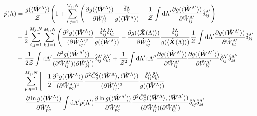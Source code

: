 \documentclass[%
 reprint,
 amsmath,amssymb,
 aps,nofootinbib,nobibnotes,onecolumn,prd
]{revtex4-2}
\begin{document}
\begin{align}
\hat{p}(\Lambda) &= \frac{
g(\expect{\hat{\bm W}^\Lambda})
}{
\mathcal{Z}
}
\Bigg(
1 
+ 
\sum_{i,j=1}^{M_j,N}\left(\frac{\partial g(\expect{\hat{\bm W}^\Lambda})}{\partial \hat{W}_{ij}^\Lambda}\frac{\hat{\delta}_{ij}^\Lambda}{g(\expect{\hat{\bm W}^\Lambda})}
-
\frac{1}{\mathcal{Z}}\int {\rm d}\Lambda'\frac{\partial g(\expect{\hat{\bm W}^{\Lambda'}})}{\partial \hat{W}_{ij}^{\Lambda'}}\hat{\delta}_{ij}^{\Lambda'}\right) \nonumber \\
&+ 
\frac{1}{2}\sum_{i,j=1}^{M_j,N}\sum_{k,l=1}^{M_l,N}
\left(\frac{\partial^2 g(\expect{\hat{\bm W}^\Lambda})}{(\partial \hat{W}_{ij}^\Lambda)^2}\frac{\hat{\delta}_{ij}^\Lambda\hat{\delta}_{kl}^\Lambda}{g(\expect{\hat{\bm W}^\Lambda})} -
\frac{\partial g(\expect{\hat{\bm X}(\Lambda)})}{\partial \hat{W}_{ij}^\Lambda}\frac{\hat{\delta}_{ij}^\Lambda}{g(\expect{\hat{\bm X}(\Lambda)})} \frac{1}{\mathcal{Z}}\int {\rm d}\Lambda'\frac{\partial g(\expect{\hat{\bm W}^{\Lambda'}})}{\partial \hat{W}_{kl}^{\Lambda'}}\hat{\delta}_{kl}^{\Lambda'} \right.
\nonumber \\ 
&- \left. \frac{1}{2\mathcal{Z}}\int {\rm d}\Lambda' \frac{\partial^2 g(\expect{\hat{\bm W}^{\Lambda'}})}{(\partial \hat{W}_{ij}^{\Lambda'})(\partial \hat{W}_{kl}^{\Lambda'})}\hat{\delta}_{ij}^{\Lambda'}\hat{\delta}_{kl}^{\Lambda'}
+
\frac{1}{\mathcal{Z}^2}\int {\rm d}\Lambda' {\rm d}\Lambda''\frac{\partial g(\expect{\hat{\bm W}^{\Lambda'}})}{\partial \hat{W}_{ij}^{\Lambda'}}\frac{\partial g(\expect{\hat{\bm W}^{\Lambda''}})}{\partial \hat{W}_{kl}^{\Lambda'}}\hat{\delta}_{ij}^{\Lambda'}\hat{\delta}_{kl}^{\Lambda''} \right. \nonumber \\
&+ 
\left. \sum_{p,q=1}^{M_q,N}\left[-\frac{1}{2} \frac{\partial^2g(\expect{\hat{\bm W}^\Lambda})}{(\partial \hat{W}^\Lambda_{pq})^2}\frac{\partial^2\hat{C}^2_q(\expect{\hat{\bm W}^\Lambda}, \expect{\hat{\bm W}^\Lambda})}{(\partial \hat{W}_{ij}^\Lambda)^2}\frac{\hat{\delta}_{ij}^\Lambda\hat{\delta}_{kl}^\Lambda}{g(\expect{\hat{\bm W}^\Lambda})} \nonumber \right.\right. \\ 
&+ 
\left.\left. \frac{\partial \ln g(\expect{\hat{\bm W}^\Lambda})}{\partial \hat{W}^\Lambda_{pq}}\int {\rm d}\Lambda' p(\Lambda') \frac{\partial \ln g(\expect{\hat{\bm W}^{\Lambda'}})}{\partial \hat{W}^{\Lambda'}_{pq}}\frac{\partial^2 \hat{C}^2_q(\expect{\hat{\bm W}^\Lambda}, \expect{\hat{\bm W}^{\Lambda'}})}{(\partial \hat{W}_{ij}^\Lambda)(\partial \hat{W}_{kl}^{\Lambda'})}\hat{\delta}_{ij}^\Lambda\hat{\delta}_{kl}^{\Lambda'} \nonumber \right.\right. \\ 

\end{align}
\end{document}
